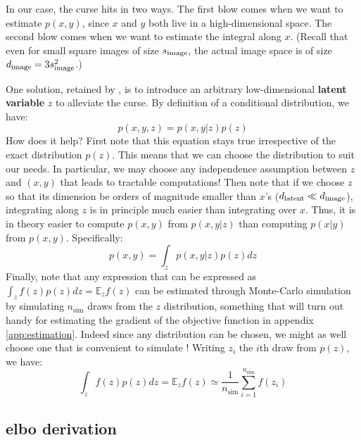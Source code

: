 \documentclass{article}
\begin{document}
\begin{appendix}
\begin{multicols}{2}
In our case, the curse hits in two ways. The first blow comes when we want to estimate $p(x,y)$, since $x$ and $y$ both live in a high-dimensional space. The second blow comes when we want to estimate the integral along $x$. (Recall that even for small square images of size $s_{\mathrm{image}}$, the actual image space is of size $d_{\mathrm{image}}=3s_{\mathrm{image}}^2$.)

One solution, retained by \citet{zeroshot}, is to introduce an arbitrary low-dimensional \textbf{latent variable} $z$ to alleviate the curse. By definition of a conditional distribution, we have:
$$p(x,y,z)=p(x,y | z) p(z)$$
How does it help? First note that this equation stays true irrespective of the exact distribution $p(z)$. This means that we can choose the distribution to suit our needs. In particular, we may choose any independence assumption between $z$ and $(x,y)$ that leads to tractable computations! Then note that if we choose $z$ so that its dimension be orders of magnitude smaller than $x$'s (${d_{\mathrm{latent}}}\ll d_{\mathrm{image}}$), integrating along $z$ is in principle much easier than integrating over $x$. Thus, it is in theory easier to compute $p(x,y)$ from $p(x,y | z)$ than computing $p(x|y)$ from $p(x,y)$. Specifically:
$$p(x,y)=\int_z p(x,y | z) p(z) dz$$
Finally, note that any expression that can be expressed as $\int_z f(z) p(z) dz=\mathbb{E}_z f(z)$ can be estimated through Monte-Carlo simulation by simulating $n_\text{sim}$ draws from the $z$ distribution, something that will turn out handy for estimating the gradient of the objective function in appendix \ref{app:estimation}. Indeed since any distribution can be chosen, we might as well choose one that is convenient to simulate ! Writing $z_i$ the $i$th draw from $p(z)$, we have:
$$\int_z f(z) p(z) dz=\mathbb{E}_z f(z)\simeq \frac{1}{n_\text{sim}}\sum_{i=1}^{n_\text{sim}} f(z_i)$$

\end{multicols}

\clearpage


\subsection{\gls{elbo} derivation} \label{app:elbo}


\end{appendix}
\end{document}
